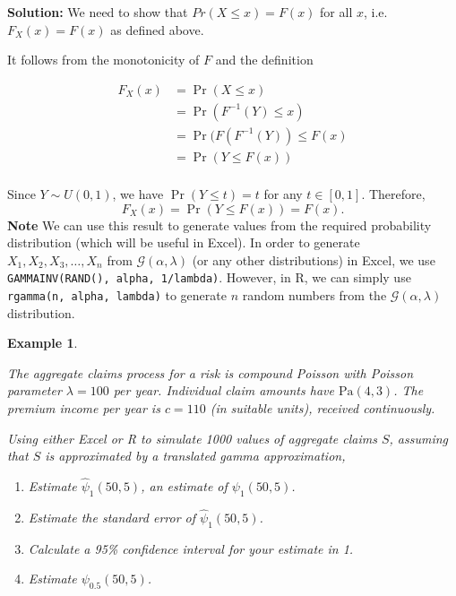 \documentclass[landscape, 20pt]{extreport}
\theoremstyle{definition}
\theoremstyle{definition}
\newtheorem{example}{Example}[chapter]
\theoremstyle{definition}
\theoremstyle{definition}
\theoremstyle{remark}
\begin{document}
\textbf{Solution:}
We need to show that \(Pr(X \le x) = F(x)\) for all \(x\), i.e.~\(F_X(x)= F(x)\) as defined above.

It follows from the monotonicity of \(F\) and the definition

\begin{align}
F_X(x) &= \Pr(X \le x)\\
&= \Pr(F^{-1}(Y) \le x)\\
&= \Pr(F(F^{-1}(Y)) \le F(x)\\
&= \Pr(Y \le F(x))\\
\end{align}

Since \(Y \sim U(0,1)\), we have \(\Pr(Y \le t) = t\) for any \(t \in [0,1]\). Therefore,
\[ F_X(x) = \Pr(Y \le F(x)) = F(x).\]
\textbf{Note} We can use this result to generate values from the required probability distribution (which will be useful in Excel). In order to generate \(X_1, X_2, X_3, \ldots, X_n\) from \(\mathcal{G}(\alpha,\lambda)\) (or any other distributions) in Excel, we use \texttt{GAMMAINV(RAND(),\ alpha,\ 1/lambda)}. However, in R, we can simply use \texttt{rgamma(n,\ alpha,\ lambda)} to generate \(n\) random numbers from the \(\mathcal{G}(\alpha,\lambda)\) distribution.

\newpage \begin{example}
\protect\hypertarget{exm:unlabeled-div-60}{}\label{exm:unlabeled-div-60}

\emph{The aggregate claims process for a risk is compound
Poisson with Poisson parameter \(\lambda = 100\) per year. Individual
claim amounts have \(\text{Pa}(4,3)\). The premium income per year is
\(c = 110\) (in suitable units), received continuously.}

\emph{Using either Excel or R to simulate 1000 values of aggregate claims
\(S\), assuming that \(S\) is approximated by a translated gamma
approximation,}

\begin{enumerate}
\def\labelenumi{\arabic{enumi}.}
\item
  \emph{Estimate
  \(\hat{\psi}_1(50, 5)\), an estimate of \(\psi_1(50,5)\).}
\item
  \emph{Estimate the standard error of \(\hat{\psi}_1(50, 5)\).}
\item
  \emph{Calculate a 95\% confidence interval for your estimate in 1.}
\item
  \emph{Estimate \(\psi_{0.5}(50, 5)\).}
\end{enumerate}

\end{example}
\end{document}
